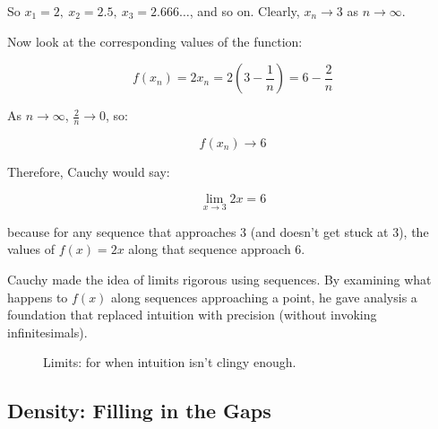 So \( x_1 = 2,\ x_2 = 2.5,\ x_3 = 2.666\dots \), and so on. Clearly, \( x_n \to 3 \) as \( n \to \infty \).

Now look at the corresponding values of the function:

\[
f(x_n) = 2x_n = 2 \left( 3 - \frac{1}{n} \right) = 6 - \frac{2}{n}
\]

As \( n \to \infty \), \( \frac{2}{n} \to 0 \), so:

\[
f(x_n) \to 6
\]

Therefore, Cauchy would say:

\[
\lim_{x \to 3} 2x = 6
\]

because for any sequence that approaches 3 (and doesn’t get stuck at 3), the values of \( f(x) = 2x \) along that sequence approach 6.


Cauchy made the idea of limits rigorous using sequences. By examining what happens to \( f(x) \) along sequences approaching a point, he gave analysis a foundation that replaced intuition with precision (without invoking infinitesimals).

\begin{figure}[H]
\centering
{}
\caption{Limits: for when intuition isn't clingy enough.}
\end{figure}






\subsection{Density: Filling in the Gaps}

